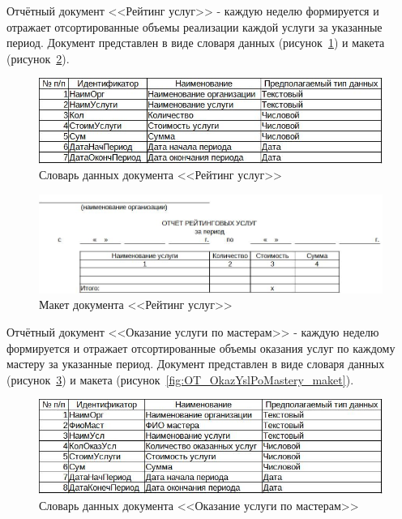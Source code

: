 \documentclass[12pt, a4paper, simple]{eskdtext}
\begin{document}
    Отчётный документ <<Рейтинг услуг>>
    - каждую неделю формируется и отражает отсортированные объемы реализации каждой услуги за указанные период.
    Документ представлен в виде словаря данных (рисунок~\ref{fig:OT_ReitYslyg_tipi})
    и макета (рисунок~\ref{fig:OT_ReitYslyg_maket}).

    \begin{figure}[!h]
        \centering
        \includegraphics[]
            {_docs/ОТ_РейтУслуг_типы.jpg}
        \caption{Словарь данных документа <<Рейтинг услуг>>}
        \label{fig:OT_ReitYslyg_tipi}
    \end{figure}

    \begin{figure}[!h]
        \centering
        \includegraphics[width=16cm]
            {_docs/ОТ_РейтУслуг_макет.jpg}
        \caption{Макет документа <<Рейтинг услуг>>}
        \label{fig:OT_ReitYslyg_maket}
    \end{figure}

    Отчётный документ <<Оказание услуги по мастерам>>
    - каждую неделю формируется и отражает отсортированные объемы оказания услуг по каждому мастеру за указанные период.
    Документ представлен в виде словаря данных (рисунок~\ref{fig:OT_OkazYslPoMastery_tipi})
    и макета (рисунок~\ref{fig:OT_OkazYslPoMastery_maket}).

    \begin{figure}[!h]
        \centering
        \includegraphics[]
            {_docs/ОТ_ОказУслПоМастеру_типы.jpg}
        \caption{Словарь данных документа <<Оказание услуги по мастерам>>}
        \label{fig:OT_OkazYslPoMastery_tipi}
    \end{figure}
\end{document}
